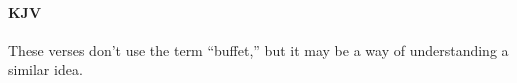 	
		\paragraph{KJV}
			\label{BUFFET-OT-KJV}
	
			
			\begin{compactdesc}
				\item[{\hyperref[MATTHEW-5-25]{Matthew 5:25--26}}]
					\begin{compactitem}
						\item These verses don't use the term ``buffet,'' but it may be a way of understanding a similar idea.
					\end{compactitem}
			\end{compactdesc}
			
		
			
				
